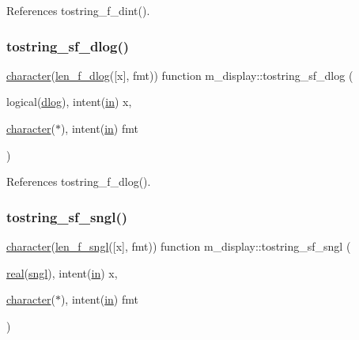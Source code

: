 References tostring\+\_\+f\+\_\+dint().

\mbox{\label{namespacem__display_a833175a75a1f2563fb749394bc577196}} 
\subsubsection{\texorpdfstring{tostring\+\_\+sf\+\_\+dlog()}{tostring\_sf\_dlog()}}
{\footnotesize\ttfamily \hyperlink{option__stopwatch_83_8txt_abd4b21fbbd175834027b5224bfe97e66}{character}(\hyperlink{namespacem__display_a2a298a8f2faf00047152b93cd265d396}{len\+\_\+f\+\_\+dlog}(\mbox{[}x\mbox{]}, fmt)) function m\+\_\+display\+::tostring\+\_\+sf\+\_\+dlog (\begin{DoxyParamCaption}\item[{logical(\hyperlink{namespacem__display_a8c6a3df510feabf6bc84dd0a8789f98c}{dlog}), intent(\hyperlink{M__journal_83_8txt_afce72651d1eed785a2132bee863b2f38}{in})}]{x,  }\item[{\hyperlink{option__stopwatch_83_8txt_abd4b21fbbd175834027b5224bfe97e66}{character}($\ast$), intent(\hyperlink{M__journal_83_8txt_afce72651d1eed785a2132bee863b2f38}{in})}]{fmt }\end{DoxyParamCaption})\hspace{0.3cm}{\ttfamily [private]}}



References tostring\+\_\+f\+\_\+dlog().

\mbox{\label{namespacem__display_a7767d9921f1509c55b3cae0cb7ba69b4}} 
\subsubsection{\texorpdfstring{tostring\+\_\+sf\+\_\+sngl()}{tostring\_sf\_sngl()}}
{\footnotesize\ttfamily \hyperlink{option__stopwatch_83_8txt_abd4b21fbbd175834027b5224bfe97e66}{character}(\hyperlink{namespacem__display_ae0feb946fbc4c31f8ba53e20719fa508}{len\+\_\+f\+\_\+sngl}(\mbox{[}x\mbox{]}, fmt)) function m\+\_\+display\+::tostring\+\_\+sf\+\_\+sngl (\begin{DoxyParamCaption}\item[{\hyperlink{read__watch_83_8txt_abdb62bde002f38ef75f810d3a905a823}{real}(\hyperlink{namespacem__display_a2ac86bc535c3ccc5947dbb3109c666b5}{sngl}), intent(\hyperlink{M__journal_83_8txt_afce72651d1eed785a2132bee863b2f38}{in})}]{x,  }\item[{\hyperlink{option__stopwatch_83_8txt_abd4b21fbbd175834027b5224bfe97e66}{character}($\ast$), intent(\hyperlink{M__journal_83_8txt_afce72651d1eed785a2132bee863b2f38}{in})}]{fmt }\end{DoxyParamCaption})\hspace{0.3cm}{\ttfamily [private]}}



